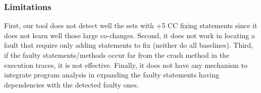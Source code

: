 

\subsubsection{Limitations}
First, our tool does not detect well the sets with +5 CC fixing statements
since it does not learn well those large co-changes. Second, it
does not work in locating a fault that require only adding
statements to fix (neither do all baselines).
Third, if the faulty statements/methods occur far from the crash
method in the execution traces, it is not effective.
Finally, it does not have any mechanism to integrate program analysis
in expanding the faulty statements having dependencies with the
detected faulty ones.




